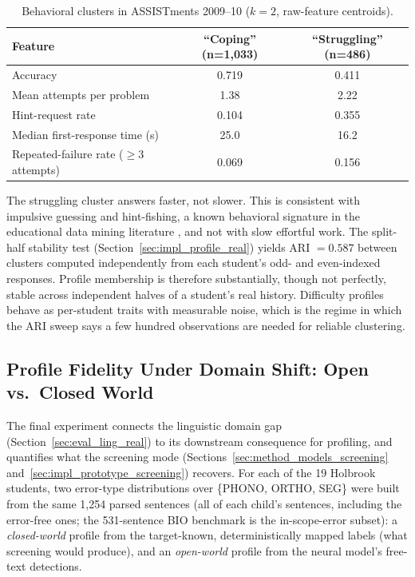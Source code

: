 \begin{table}[h]
\centering
\caption{Behavioral clusters in ASSISTments 2009--10 ($k=2$, raw-feature centroids).}
\label{tab:assistments_clusters}
\begin{tabular}{lcc}
\toprule
\textbf{Feature} & \textbf{``Coping'' (n=1{,}033)} & \textbf{``Struggling'' (n=486)} \\
\midrule
Accuracy & 0.719 & 0.411 \\
Mean attempts per problem & 1.38 & 2.22 \\
Hint-request rate & 0.104 & 0.355 \\
Median first-response time (s) & 25.0 & 16.2 \\
Repeated-failure rate ($\geq 3$ attempts) & 0.069 & 0.156 \\
\bottomrule
\end{tabular}
\end{table}

The struggling cluster answers faster, not slower. This is consistent with impulsive guessing and hint-fishing, a known behavioral signature in the educational data mining literature \parencite{BakerYacef2009}, and not with slow effortful work. The split-half stability test (Section~\ref{sec:impl_profile_real}) yields ARI $= 0.587$ between clusters computed independently from each student's odd- and even-indexed responses. Profile membership is therefore substantially, though not perfectly, stable across independent halves of a student's real history. Difficulty profiles behave as per-student traits with measurable noise, which is the regime in which the ARI sweep says a few hundred observations are needed for reliable clustering.

\subsection{Profile Fidelity Under Domain Shift: Open vs.\ Closed World}
\label{sec:eval_profile_fidelity}

The final experiment connects the linguistic domain gap (Section~\ref{sec:eval_ling_real}) to its downstream consequence for profiling, and quantifies what the screening mode (Sections~\ref{sec:method_models_screening} and~\ref{sec:impl_prototype_screening}) recovers. For each of the 19 Holbrook students, two error-type distributions over \{PHONO, ORTHO, SEG\} were built from the same 1{,}254 parsed sentences (all of each child's sentences, including the error-free ones; the 531-sentence BIO benchmark is the in-scope-error subset): a \emph{closed-world} profile from the target-known, deterministically mapped labels (what screening would produce), and an \emph{open-world} profile from the neural model's free-text detections.

